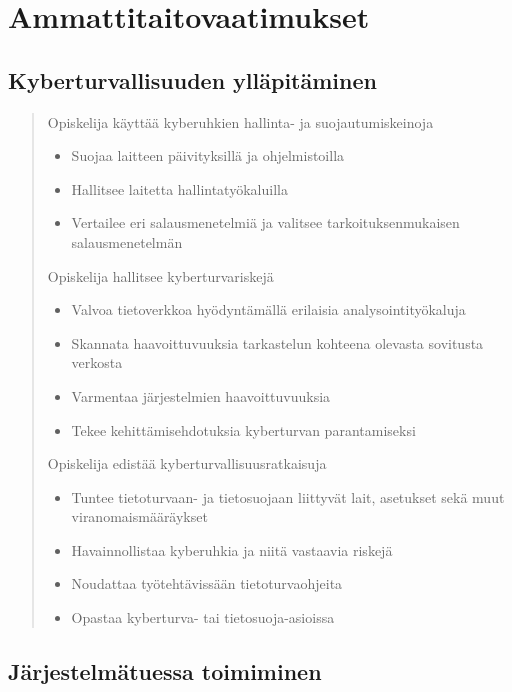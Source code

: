 \documentclass[../wifi-security.tex]{subfiles}
\begin{document}
\chapter{Ammattitaitovaatimukset}

\section{Kyberturvallisuuden ylläpitäminen}

\begin{quote}
Opiskelija käyttää kyberuhkien hallinta- ja suojautumiskeinoja
\begin{itemize}
\item Suojaa laitteen päivityksillä ja ohjelmistoilla
\item Hallitsee laitetta hallintatyökaluilla
\item Vertailee eri salausmenetelmiä ja valitsee tarkoituksenmukaisen salausmenetelmän
\end{itemize}
Opiskelija hallitsee kyberturvariskejä
\begin{itemize}
\item Valvoa tietoverkkoa hyödyntämällä erilaisia analysointityökaluja
\item Skannata haavoittuvuuksia tarkastelun kohteena olevasta sovitusta verkosta
\item Varmentaa järjestelmien haavoittuvuuksia
\item Tekee kehittämisehdotuksia kyberturvan parantamiseksi
\end{itemize}
Opiskelija edistää kyberturvallisuusratkaisuja
\begin{itemize}
\item Tuntee tietoturvaan- ja tietosuojaan liittyvät lait, asetukset sekä muut viranomaismääräykset
\item Havainnollistaa kyberuhkia ja niitä vastaavia riskejä
\item Noudattaa työtehtävissään tietoturvaohjeita
\item Opastaa kyberturva- tai tietosuoja-asioissa
\end{itemize}
\end{quote}

\section{Järjestelmätuessa toimiminen}
\end{document}
